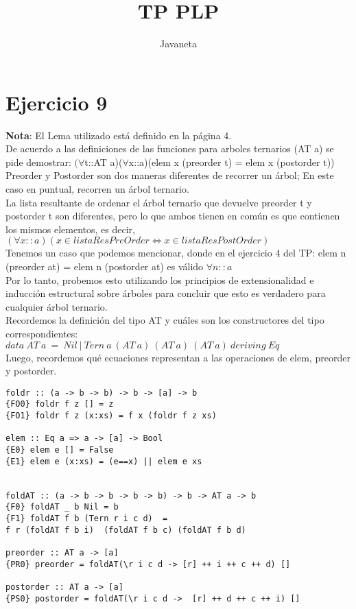\documentclass{article}
\title{TP PLP}
\author{Javaneta}
\begin{document}
\newcommand{\streq}[1]{\stackrel{\text{#1}}{=}}

\maketitle

\section{Ejercicio 9}
\textbf{Nota}: El Lema utilizado está definido en la página 4. \\
De acuerdo a las definiciones de las funciones para arboles ternarios (AT a) se pide demostrar: $(\forall$t::AT a)($\forall$x::a)(elem x (preorder t) = elem x (postorder t))  \\

Preorder y Postorder son dos maneras diferentes de recorrer un árbol; En este caso en puntual, recorren un árbol ternario.  \\

La lista resultante de ordenar el árbol ternario que devuelve preorder t y postorder t son diferentes, pero lo que ambos tienen en común es que contienen los mismos elementos, es decir, $(\forall x::a) (x \in listaResPreOrder \iff x \in listaResPostOrder)$ \\
Tenemos un caso que podemos mencionar, donde en el ejercicio 4 del TP: elem n (preorder at) = elem n (postorder at) es válido $\forall n::a$ \\

Por lo tanto, probemos esto utilizando los principios de extensionalidad e inducción estructural sobre árboles para concluir que esto es verdadero para cualquier árbol ternario.  \\

Recordemos la definición del tipo AT y cuáles son los constructores del tipo correspondientes: $ data \ AT \ a \ = \ Nil \ | \ Tern \ a \ (AT \ a) \ (AT \ a) \ (AT \ a) \ deriving \ Eq$ \\

Luego, recordemos qué ecuaciones representan a las operaciones de elem, preorder y postorder. 

\begin{lstlisting}
foldr :: (a -> b -> b) -> b -> [a] -> b
{FO0} foldr f z [] = z
{FO1} foldr f z (x:xs) = f x (foldr f z xs)

elem :: Eq a => a -> [a] -> Bool
{E0} elem e [] = False
{E1} elem e (x:xs) = (e==x) || elem e xs


foldAT :: (a -> b -> b -> b -> b) -> b -> AT a -> b 
{F0} foldAT _ b Nil = b 
{F1} foldAT f b (Tern r i c d)  = 
f r (foldAT f b i)  (foldAT f b c) (foldAT f b d)

preorder :: AT a -> [a]
{PR0} preorder = foldAT(\r i c d -> [r] ++ i ++ c ++ d) []

postorder :: AT a -> [a]
{PS0} postorder = foldAT(\r i c d ->  [r] ++ d ++ c ++ i) []
\end{lstlisting}
\end{document}
